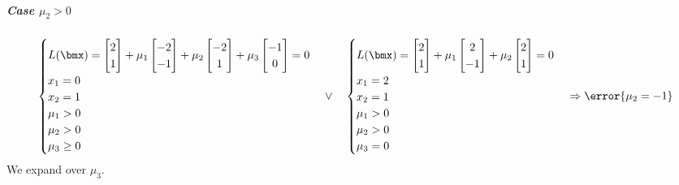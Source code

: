 \documentclass[\main/main.tex]{subfiles}
\begin{document}
\subparagraph*{Case $\mu_2>0$}
\[
  \begin{cases}
    L(\bmx) = \begin{bmatrix}
      2 \\
      1
    \end{bmatrix} + \mu_1 \begin{bmatrix}
      -2 \\
      -1
    \end{bmatrix} + \mu_2 \begin{bmatrix}
      -2 \\
      1
    \end{bmatrix} + \mu_3 \begin{bmatrix}
      -1 \\
      0
    \end{bmatrix} = 0 \\
    x_1                           = 0                                                                                                                 \\
    x_2                           = 1                                                                                                                 \\
    \mu_1 > 0                                                                                                                                         \\
    \mu_2 > 0                                                                                                                                         \\
    \mu_3 \geq 0
  \end{cases}
  \lor
  \quad
  \begin{cases}
    L(\bmx) = \begin{bmatrix}
      2 \\
      1
    \end{bmatrix} + \mu_1 \begin{bmatrix}
      2 \\
      -1
    \end{bmatrix} + \mu_2 \begin{bmatrix}
      2 \\
      1
    \end{bmatrix} = 0 \\
    x_1                           = 2                                                                              \\
    x_2                           = 1                                                                              \\
    \mu_1 > 0                                                                                                      \\
    \mu_2 > 0                                                                                                      \\
    \mu_3 = 0
  \end{cases}
  \Rightarrow
  \error{\mu_2 = -1}
\]
We expand over $\mu_3$.
\end{document}
